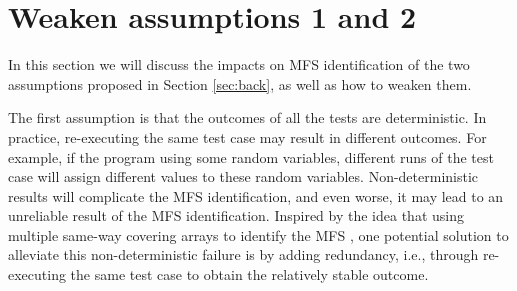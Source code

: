 \documentclass{sig-alternate-05-2015}
\begin{document}
{{%
%

%

\section{Weaken assumptions 1 and 2}
In this section we will discuss the impacts on MFS identification of the two assumptions proposed in Section \ref{sec:back}, as well as how to weaken them.

The first assumption is that the outcomes of all the tests are deterministic. In practice, re-executing the same test case may result in different outcomes. For example, if the program using some random variables, different runs of the test case will assign different
values to these random variables. Non-deterministic results will complicate the MFS identification, and even worse, it may lead to an unreliable result of the MFS identification. Inspired by the idea that using multiple same-way covering arrays to identify the MFS \cite{fouche2009incremental,yilmaz2006covering}, one potential solution to alleviate this non-deterministic failure is by adding redundancy, i.e., through re-executing the same test case to obtain the relatively stable outcome.

}}
\end{document}
